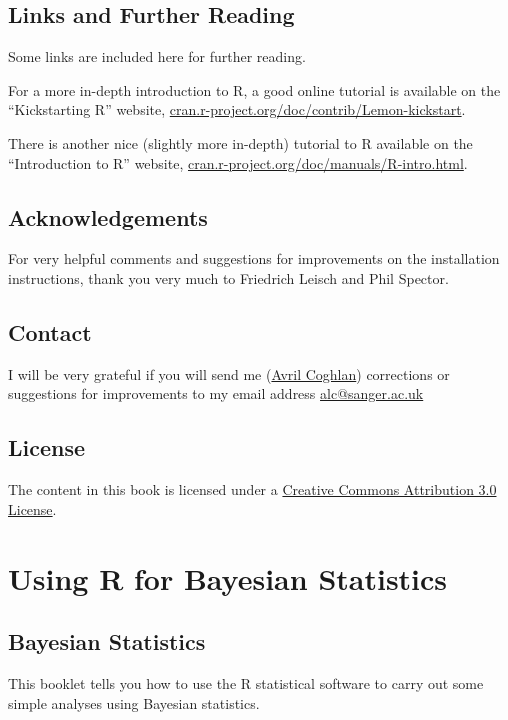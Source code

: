 \documentclass[a4paper,10pt,english]{sphinxmanual}
\begin{document}
\section{Links and Further Reading}
\label{src/installr:links-and-further-reading}
Some links are included here for further reading.

For a more in-depth introduction to R, a good online tutorial is
available on the ``Kickstarting R'' website,
\href{http://cran.r-project.org/doc/contrib/Lemon-kickstart/}{cran.r-project.org/doc/contrib/Lemon-kickstart}.

There is another nice (slightly more in-depth) tutorial to R
available on the ``Introduction to R'' website,
\href{http://cran.r-project.org/doc/manuals/R-intro.html}{cran.r-project.org/doc/manuals/R-intro.html}.


\section{Acknowledgements}
\label{src/installr:acknowledgements}
For very helpful comments and suggestions for improvements on the installation instructions, thank you very much to Friedrich Leisch and Phil Spector.


\section{Contact}
\label{src/installr:contact}
I will be very grateful if you will send me (\href{http://www.sanger.ac.uk/research/projects/parasitegenomics/}{Avril Coghlan}) corrections or suggestions for improvements to
my email address \href{mailto:alc@sanger.ac.uk}{alc@sanger.ac.uk}


\section{License}
\label{src/installr:license}
The content in this book is licensed under a \href{http://creativecommons.org/licenses/by/3.0/}{Creative Commons Attribution 3.0 License}.


\chapter{Using R for Bayesian Statistics}
\label{src/bayesianstats::doc}\label{src/bayesianstats:using-r-for-bayesian-statistics}

\section{Bayesian Statistics}
\label{src/bayesianstats:bayesian-statistics}
This booklet tells you how to use the R statistical software to carry out some simple
analyses using Bayesian statistics.
\end{document}

